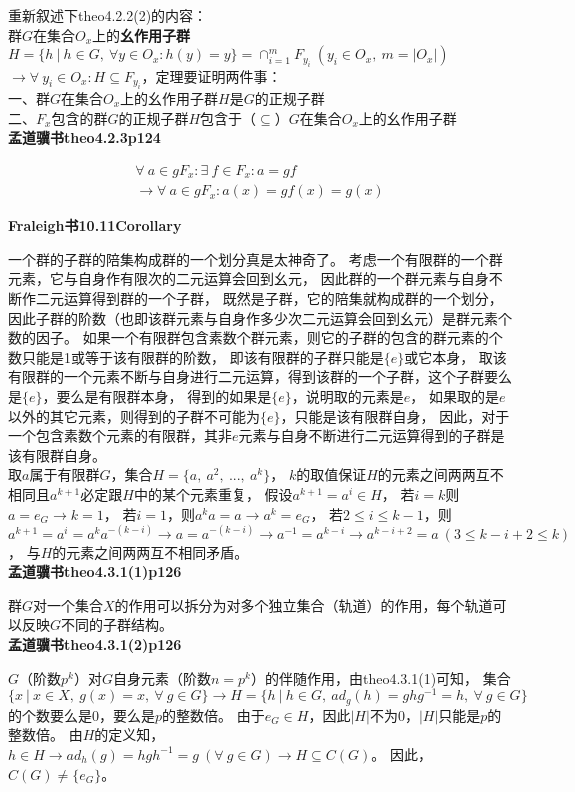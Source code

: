 \noindent 重新叙述下theo4.2.2(2)的内容：\\
群$G$在集合$O_{x}$上的\textbf{幺作用子群}$H=\{h\ |\ h\in G,\ \forall y\in O_{x}:h(y)=y\}=\cap_{i=1}^{m} F_{y_{i}}\ (y_{i}\in O_{x},\ m=|O_{x}|)$
$\rightarrow \forall\ y_{i}\in O_{x}:H\subseteq F_{y_{i}}$，定理要证明两件事：\\
一、群$G$在集合$O_{x}$上的幺作用子群$H$是$G$的正规子群\\
二、$F_{x}$包含的群$G$的正规子群$H$包含于（$\subseteq$）$G$在集合$O_{x}$上的幺作用子群\\

\textbf{孟道骥书\cite{meng2010}theo4.2.3p124}

\begin{gather}
    \forall\ a \in gF_{x}:\exists\ f\in F_{x}:a=gf\\
    \rightarrow \forall\ a \in gF_{x}:a(x)=gf(x)=g(x)
\end{gather}

\textbf{Fraleigh书\cite{Fraleigh2002}10.11Corollary}

一个群的子群的陪集构成群的一个划分真是太神奇了。
考虑一个有限群的一个群元素，它与自身作有限次的二元运算会回到幺元，
因此群的一个群元素与自身不断作二元运算得到群的一个子群，
既然是子群，它的陪集就构成群的一个划分，
因此子群的阶数（也即该群元素与自身作多少次二元运算会回到幺元）是群元素个数的因子。
如果一个有限群包含素数个群元素，则它的子群的包含的群元素的个数只能是1或等于该有限群的阶数，
即该有限群的子群只能是$\{e\}$或它本身，
取该有限群的一个元素不断与自身进行二元运算，得到该群的一个子群，这个子群要么是$\{e\}$，要么是有限群本身，
得到的如果是$\{e\}$，说明取的元素是$e$，
如果取的是$e$以外的其它元素，则得到的子群不可能为$\{e\}$，只能是该有限群自身，
因此，对于一个包含素数个元素的有限群，其非$e$元素与自身不断进行二元运算得到的子群是该有限群自身。\\

取$a$属于有限群$G$，集合$H=\{a,\ a^{2},\ ...,\ a^{k}\}$，
$k$的取值保证$H$的元素之间两两互不相同且$a^{k+1}$必定跟$H$中的某个元素重复，
假设$a^{k+1}=a^{i}\in H$，
若$i=k$则$a=e_{G}\rightarrow k=1$，
若$i=1$，则$a^{k}a=a\rightarrow a^{k}=e_{G}$，
若$2\leq i\leq k-1$，则$a^{k+1}=a^{i}=a^{k}a^{-(k-i)}\rightarrow a=a^{-(k-i)}\rightarrow a^{-1}=a^{k-i}\rightarrow a^{k-i+2}=a\ (3\leq k-i+2\leq k)$，
与$H$的元素之间两两互不相同矛盾。\\

\textbf{孟道骥书\cite{meng2010}theo4.3.1(1)p126}

群$G$对一个集合$X$的作用可以拆分为对多个独立集合（轨道）的作用，每个轨道可以反映$G$不同的子群结构。\\

\textbf{孟道骥书\cite{meng2010}theo4.3.1(2)p126}

$G$（阶数$p^{k}$）对$G$自身元素（阶数$n=p^{k}$）的伴随作用，由theo4.3.1(1)可知，
集合$\{x\ |\ x\in X,\ g(x)=x,\ \forall\ g\in G\}\rightarrow H=\{h\ |\ h\in G,\ ad_{g}(h)=ghg^{-1}=h,\ \forall\ g\in G\}$的个数要么是0，要么是$p$的整数倍。
由于$e_{G}\in H$，因此$|H|$不为0，$|H|$只能是$p$的整数倍。
由$H$的定义知，$h\in H\rightarrow ad_{h}(g)=hgh^{-1}=g\ (\forall\ g\in G)\rightarrow H\subseteq C(G)$。
因此，$C(G)\neq \{e_{G}\}$。\\



